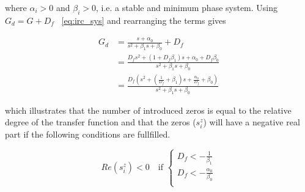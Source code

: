 where  $\alpha_i > 0$ and  $\beta_i > 0$, i.e. a stable and minimum phase system.  Using $G_d = G + D_f$  ~\eqref{eq:irc_sys} and rearranging the terms gives

\begin{equation}
  \label{eq:irc_sys_d}
  \begin{split}
  G_d & = \frac{s + \alpha_0}{s^2 + \beta_1s + \beta_0} + D_f \\
      & = \frac{D_fs^2 + (1 + D_f\beta_1)s + \alpha_0 + D_f\beta_0}{s^2 + \beta_1s + \beta_0} \\
      & = \frac{D_f(s^2 + (\frac{1}{D_f} + \beta_1)s + \frac{\alpha_0}{D_f} + \beta_0)}{s^2 + \beta_1s + \beta_0}
  \end{split}
\end{equation}

which illustrates that the number of introduced zeros is equal to the relative degree of the transfer function and that the zeros ($s^z_i$) will have a negative real part if the following conditions are fullfilled.

\begin{equation}
  \label{eq:irc_cond}
  Re(s^z_i) < 0 \quad \text{if }
  \begin{cases}
    D_f < -\frac{1}{\beta_1}\\
    D_f < -\frac{\alpha_0}{\beta_0}\\
  \end{cases}
\end{equation}





